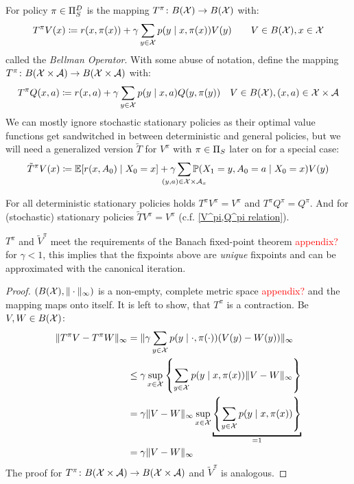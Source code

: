 \begin{definition} 
	For policy \(\pi\in\Pi_S^D\) is the mapping \(T^\pi\colon B(\mathcal{X})\to B(\mathcal{X})\) with:
	\[
		T^\pi V(x)\coloneqq r(x,\pi(x))+\gamma\sum_{y\in\mathcal{X}}p(y\mid x,\pi(x)) V(y)\qquad V\in B(\mathcal{X}), x\in\mathcal{X}
	\]
	called the \emph{Bellman Operator}. With some abuse of notation, define the mapping \(T^\pi\colon B(\mathcal{X}\times\mathcal{A})\to B(\mathcal{X}\times\mathcal{A})\) with:
	\[
		T^\pi Q(x,a)\coloneqq r(x,a)+\gamma\sum_{y\in\mathcal{X}}p(y\mid x,a) Q(y,\pi(y))\quad V\in B(\mathcal{X}), (x,a)\in\mathcal{X}\times\mathcal{A} 
	\]
	We can mostly ignore stochastic stationary policies as their optimal value functions get sandwitched in between deterministic and general policies, but we will need a generalized version \(\tilde{T}\) for \(V^\pi\) with \(\pi\in\Pi_S\) later on for a special case:
	\[
		\tilde{T}^\pi V(x)\coloneqq \E[r(x,A_0)\mid X_0=x] 
		+ \gamma \smashoperator[lr]{\sum_{(y,a)\in\cX\times\cA_x}} \Pr(X_1=y, A_0=a \mid X_0=x) V(y)
	\]
\end{definition}


\begin{remark}\label{T^pi unique}
	For all deterministic stationary policies holds \(T^\pi V^\pi=V^\pi \) and \(T^\pi Q^\pi=Q^\pi\). And for (stochastic) stationary policies \(\tilde{T}V^\pi=V^\pi\) (c.f. \ref{V^pi,Q^pi relation}).

	\(T^\pi\) and \(\tilde{V}^\pi\) meet the requirements of the Banach fixed-point theorem \textcolor{red}{appendix?} for \({\gamma<1}\), this implies that the fixpoints above are \emph{unique} fixpoints and can be approximated with the canonical iteration. 
\end{remark}

\begin{proof}
\((B(\mathcal{X}), \|\cdot\|_\infty)\) is a non-empty, complete metric space \textcolor{red}{appendix?} and the mapping maps onto itself. It is left to show, that \(T^\pi\) is a contraction. Be \(V,W\in B(\mathcal{X})\):
\begin{align*}
	\|T^\pi V -T^\pi W\|_\infty &=\|\gamma\sum_{y\in\cX} p(y\mid \cdot,\pi(\cdot)) (V(y)-W(y))\|_\infty\\
	&\le\gamma \sup_{x\in\cX}\left\{ \sum_{y\in\cX} p(y\mid x,\pi(x)) \|V-W\|_\infty \right\}\\
	&=\gamma \|V-W\|_\infty  \sup_{x\in\cX}\underbracket{\left\{ \sum_{y\in\cX} p(y\mid x,\pi(x)) \right\}}_{=1}\\
	&=\gamma \|V-W\|_\infty
\end{align*}
The proof for \(T^\pi\colon B(\mathcal{X}\times\mathcal{A})\to B(\mathcal{X}\times\mathcal{A})\) and \(\tilde{V}^\pi\) is analogous.
\end{proof}


